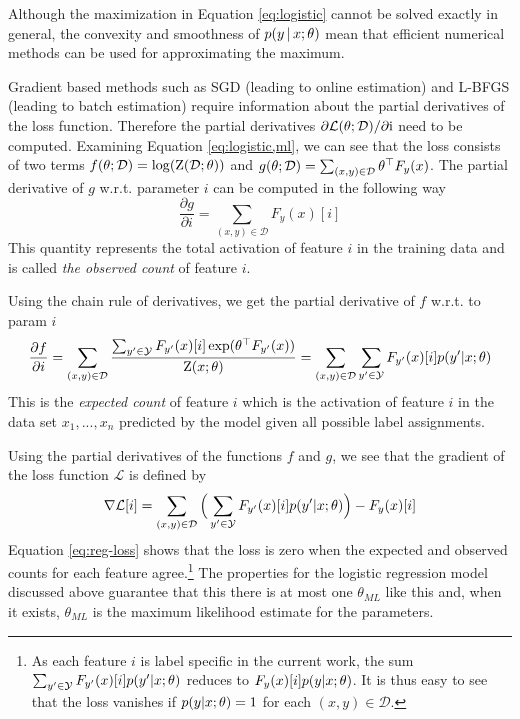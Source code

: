 Although the maximization in Equation \ref{eq:logistic} cannot be
solved exactly in general, the convexity and smoothness of
$p(y\mbox{$ \, | \, $} x\mbox{$ ; \, $} \theta)$ mean that efficient numerical methods can
be used for approximating the maximum.

Gradient based methods such as SGD (leading to online estimation) and
L-BFGS (leading to batch estimation) require information about the
partial derivatives of the loss function. Therefore the partial
derivatives $\partial\mathcal{L}(\theta\mbox{$ ; \, $}
\mathcal{D})/\partial\mbox{${\rm i}$}$ need to be computed. Examining Equation
\ref{eq:logistic,ml}, we can see that the loss consists of two terms
$f(\theta\mbox{$ ; \, $} \mathcal{D}) = \log(\mbox{${\rm Z}$}(\mathcal{D}\mbox{$ ; \, $} \theta))$
and $g(\theta\mbox{$ ; \, $}\mathcal{D}) = \sum_{(x,y) \in
  \mathcal{D}}\theta^\top F_y(x)$. The partial derivative of $g$
w.r.t. parameter $i$ can be computed in the following way
$$\frac{\partial g}{\partial i} = \sum_{(x,y) \in \mathcal{D}} F_y(x)[i]$$
This quantity represents the total activation of feature $i$ in the training data and is called {\it the observed count} of feature $i$. 

Using the chain rule of derivatives, we get the partial derivative of $f$ w.r.t. to param $i$
$$\frac{\partial f}{\partial i} = \sum_{(x,y) \in \mathcal{D}} \frac{\sum_{y' \in \mathcal{Y}}F_{y'}(x)[i] \exp(\theta^\top F_{y'}(x))}{\mbox{${\rm Z}$}(x\mbox{$ ; \, $}\theta)} = \sum_{(x,y) \in \mathcal{D}} \sum_{y' \in \mathcal{Y}}F_{y'}(x)[i] p(y'|x\mbox{$ ; \, $}\theta)$$
This is the {\it expected count} of feature $i$ which is the
activation of feature $i$ in the data set $x_1, ...,x_n$ predicted by
the model given all possible label assignments.

Using the partial derivatives of the functions $f$ and $g$, we see that the gradient of the loss function $\mathcal{L}$ is defined by
\begin{equation}\nabla \mathcal{L}[i] = \sum_{(x,y) \in \mathcal{D}} \Big( \sum_{y' \in \mathcal{Y}}F_{y'}(x)[i] p(y'|x\mbox{$ ; \, $}\theta) \Big) - F_y(x)[i] \label{eq:reg-loss}\end{equation}
Equation \ref{eq:reg-loss} shows that the loss is zero when the
expected and observed counts for each feature agree.\footnote{As each feature $i$ is label specific in the current work, the sum $\sum_{y' \in \mathcal{Y}}F_{y'}(x)[i] p(y'|x\mbox{$ ; \, $}\theta)$ reduces to $F_y(x)[i] p(y|x\mbox{$ ; \, $}\theta)$. It is thus easy to see that the loss vanishes if $p(y|x\mbox{$ ; \, $}\theta) = 1$ for each $(x,y)\in\mathcal{D}$.} The
properties for the logistic regression model discussed above guarantee
that this there is at most one $\theta_{ML}$ like this and, when it
exists, $\theta_{ML}$ is the maximum likelihood estimate for the
parameters.

